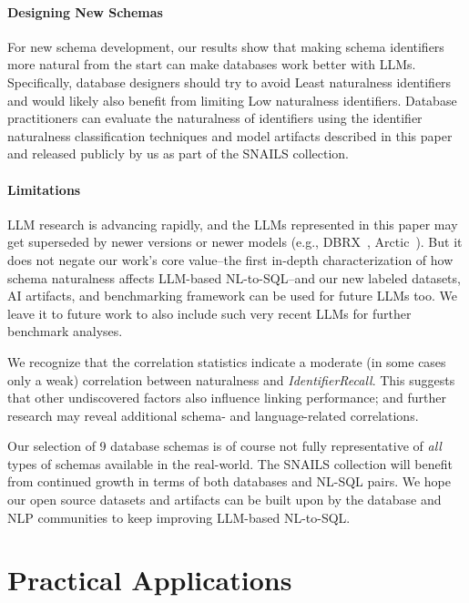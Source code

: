 \paragraph{\textbf{Designing New Schemas}}
For new schema development, our results show that making schema identifiers more natural from the start can make databases work better with LLMs.
Specifically, database designers should try to avoid Least naturalness identifiers and would likely also benefit from limiting Low naturalness identifiers.
Database practitioners can evaluate the naturalness of identifiers using the identifier naturalness classification techniques and model artifacts described in this paper and released publicly by us as part of the SNAILS collection.

\paragraph{\textbf{Limitations}}
LLM research is advancing rapidly, and the LLMs represented in this paper may get superseded by newer versions or newer models (e.g., DBRX~\cite{dbrx}, Arctic~\cite{snowflakearctic}).
But it does not negate our work's core value--the first in-depth characterization of how schema naturalness affects LLM-based NL-to-SQL--and our new labeled datasets, AI artifacts, and benchmarking framework can be used for future LLMs too.
We leave it to future work to also include such very recent LLMs for further benchmark analyses.

We recognize that the correlation statistics indicate a moderate (in some cases only a weak) correlation between naturalness and \emph{IdentifierRecall}.
This suggests that other undiscovered factors also influence linking performance; and further research may reveal additional schema- and language-related correlations.

Our selection of 9 database schemas is of course not fully representative of \emph{all} types of schemas available in the real-world.
The SNAILS collection will benefit from continued growth in terms of both databases and NL-SQL pairs.
We hope our open source datasets and artifacts can be built upon by the database and NLP communities to keep improving LLM-based NL-to-SQL.




\section{Practical Applications}

